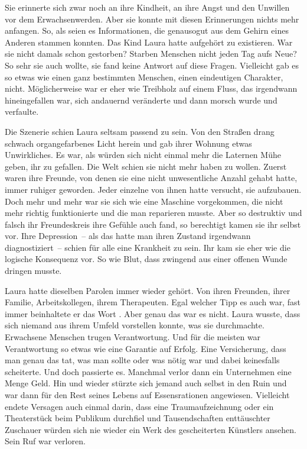 \par

Sie erinnerte sich zwar noch an ihre Kindheit, an ihre Angst und den Unwillen vor dem Erwachsenwerden.
Aber sie konnte mit diesen Erinnerungen nichts mehr anfangen.
So, als seien es Informationen, die genausogut aus dem Gehirn eines Anderen stammen konnten.
Das Kind Laura hatte aufgehört zu existieren.
War sie nicht damals schon gestorben?
Starben Menschen nicht jeden Tag aufs Neue?
So sehr sie auch wollte, sie fand keine Antwort auf diese Fragen.
Vielleicht gab es so etwas wie einen ganz bestimmten Menschen, einen eindeutigen Charakter, nicht.
Möglicherweise war er eher wie Treibholz auf einem Fluss, das irgendwann hineingefallen war, sich andauernd veränderte und dann morsch wurde und verfaulte.

\par

Die Szenerie schien Laura seltsam passend zu sein.
Von den Straßen drang schwach organgefarbenes Licht herein und gab ihrer Wohnung etwas Unwirkliches.
Es war, als würden sich nicht einmal mehr die Laternen Mühe geben, ihr zu gefallen.
Die Welt schien sie nicht mehr haben zu wollen.
Zuerst waren ihre Freunde, von denen sie eine nicht unwesentliche Anzahl gehabt hatte, immer ruhiger geworden.
Jeder einzelne von ihnen hatte versucht, sie aufzubauen.
Doch mehr und mehr war sie sich wie eine Maschine vorgekommen, die nicht mehr richtig funktionierte und die man reparieren musste.
Aber so destruktiv und falsch ihr Freundeskreis ihre Gefühle auch fand, so berechtigt kamen sie ihr selbst vor.
Ihre Depression~-- als das hatte man ihren Zustand irgendwann diagnostiziert~-- schien für alle eine Krankheit zu sein.
Ihr kam sie eher wie die logische Konsequenz vor.
So wie Blut, dass zwingend aus einer offenen Wunde dringen musste.

\par

Laura hatte dieselben Parolen immer wieder gehört.
Von ihren Freunden, ihrer Familie, Arbeitskollegen, ihrem Therapeuten.
Egal welcher Tipp es auch war, fast immer beinhaltete er das Wort .
Aber genau das war es nicht.
Laura wusste, dass sich niemand aus ihrem Umfeld vorstellen konnte, was sie durchmachte.
Erwachsene Menschen trugen Verantwortung.
Und für die meisten war Verantwortung so etwas wie eine Garantie auf Erfolg.
Eine Versicherung, dass man genau das tat, was man sollte oder was nötig war und dabei keinesfalls scheiterte.
Und doch passierte es.
Manchmal verlor dann ein Unternehmen eine Menge Geld.
Hin und wieder stürzte sich jemand auch selbst in den Ruin und war dann für den Rest seines Lebens auf Essensrationen angewiesen.
Vielleicht endete Versagen auch einmal darin, dass eine Traumaufzeichnung oder ein Theaterstück beim Publikum durchfiel und Tausendschaften enttäuschter Zuschauer würden sich nie wieder ein Werk des gescheiterten Künstlers ansehen.
Sein Ruf war verloren.

